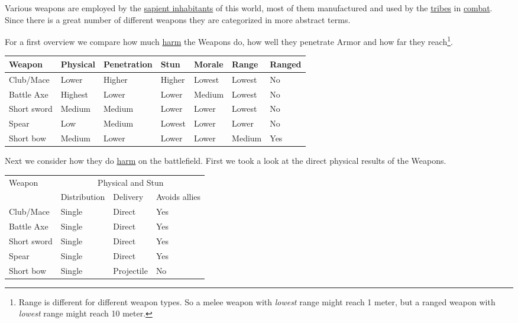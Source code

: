 Various weapons are employed by the
\hyperref[ch:World:Inhabitants:Sapients]{sapient inhabitants} of this world,
most of them manufactured and used by the \hyperref[ch:Tribes]{tribes} in
\hyperref[ch:Conflict:Combat]{combat}. Since there is a great number of
different weapons they are categorized in more abstract terms.

For a first overview we compare how much \hyperref[ch:Conflict:Combat]{harm}
the \glspl{Weapon} do, how well they penetrate \gls{Armor} and how far they
reach\footnote{ Range is different for different weapon types. So a melee
	weapon with \emph{lowest} range might reach 1 meter, but a ranged weapon with
	\emph{lowest} range might reach 10 meter. }.

\begin{longtable}{lllllll}
	\toprule
	Weapon
	 & Physical & Penetration
	 & Stun     & Morale
	 & Range    & Ranged      \\
	\midrule
	Club/Mace
	 & Lower    & Higher
	 & Higher   & Lowest
	 & Lowest   & No          \\
	Battle Axe
	 & Highest  & Lower
	 & Lower    & Medium
	 & Lowest   & No          \\
	Short sword
	 & Medium   & Medium
	 & Lower    & Lower
	 & Lowest   & No          \\
	Spear
	 & Low      & Medium
	 & Lowest   & Lower
	 & Lower    & No          \\
	Short bow
	 & Medium   & Lower
	 & Lower    & Lower
	 & Medium   & Yes         \\
	\bottomrule
\end{longtable}

Next we consider how they do \hyperref[ch:Conflict:Combat]{harm} on the
battlefield. First we took a look at the direct physical results of the
\glspl{Weapon}.

\begin{longtable}{llll}
	\toprule
	Weapon
	 & \multicolumn{3}{c}{Physical and Stun}                              \\
	 & Distribution                          & Delivery   & Avoids allies \\
	\midrule
	Club/Mace
	 & Single                                & Direct     & Yes           \\
	Battle Axe
	 & Single                                & Direct     & Yes           \\
	Short sword
	 & Single                                & Direct     & Yes           \\
	Spear
	 & Single                                & Direct     & Yes           \\
	Short bow
	 & Single                                & Projectile & No            \\
	\bottomrule
\end{longtable}

